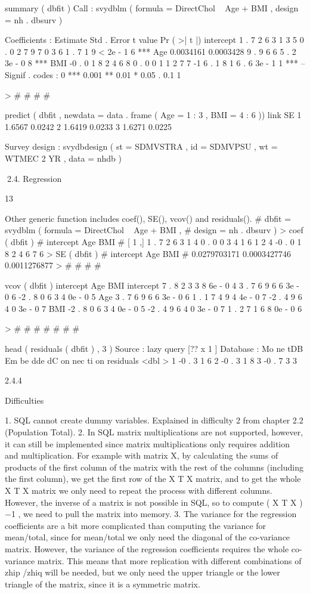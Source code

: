 summary ( dbfit )
Call :
svydblm ( formula = DirectChol ~ Age + BMI ,
design = nh . dbsurv )

Coefficients :
Estimate Std . Error t value Pr ( >| t |)
intercept 1 . 7 2 6 3 1 3 5 0 . 0 2 7 9 7 0 3 6 1 . 7 1 9 < 2e - 1 6 ***
Age
0.0034161 0.0003428
9 . 9 6 6 5 . 2 3e - 0 8 ***
BMI
-0 . 0 1 8 2 4 6 8 0 . 0 0 1 1 2 7 7 -1 6 . 1 8 1 6 . 6 3e - 1 1 ***
--Signif . codes : 0
***
0.001
**
0.01
*
0.05
.
0.1
1

>
#
#
#
#

predict ( dbfit , newdata = data . frame ( Age = 1 : 3 , BMI = 4 : 6 ))
link
SE
1 1.6567 0.0242
2 1.6419 0.0233
3 1.6271 0.0225

Survey design :
svydbdesign ( st = SDMVSTRA , id = SDMVPSU , wt = WTMEC 2 YR ,
data = nhdb )

2.4. Regression

13

Other generic function includes coef(), SE(), vcov() and residuals().
# dbfit = svydblm ( formula = DirectChol ~ Age + BMI ,
#
design = nh . dbsurv )
> coef ( dbfit )
#
intercept
Age
BMI
# [ 1 ,] 1 . 7 2 6 3 1 4 0 . 0 0 3 4 1 6 1 2 4 -0 . 0 1 8 2 4 6 7 6
> SE ( dbfit )
#
intercept
Age
BMI
# 0.0279703171 0.0003427746 0.0011276877
>
#
#
#
#

vcov ( dbfit )
intercept
Age
BMI
intercept 7 . 8 2 3 3 8 6e - 0 4 3 . 7 6 9 6 6 3e - 0 6 -2 . 8 0 6 3 4 0e - 0 5
Age
3 . 7 6 9 6 6 3e - 0 6 1 . 1 7 4 9 4 4e - 0 7 -2 . 4 9 6 4 0 3e - 0 7
BMI
-2 . 8 0 6 3 4 0e - 0 5 -2 . 4 9 6 4 0 3e - 0 7 1 . 2 7 1 6 8 0e - 0 6

>
#
#
#
#
#
#
#

head ( residuals ( dbfit ) , 3 )
Source :
lazy query [?? x 1 ]
Database : Mo ne tDB Em be dde dC on nec ti on
residuals
<dbl >
1
-0 . 3 1 6
2
-0 . 3 1 8
3
-0 . 7 3 3

2.4.4

Difficulties

1. SQL cannot create dummy variables. Explained in difficulty 2 from chapter 2.2
(Population Total).
2. In SQL matrix multiplications are not supported, however, it can still be implemented since matrix multiplications only requires addition and multiplication.
For example with matrix X, by calculating the sums of products of the first column of the matrix with the rest of the columns (including the first column), we
get the first row of the X T X matrix, and to get the whole X T X matrix we only
need to repeat the process with different columns. However, the inverse of
a matrix is not possible in SQL, so to compute ( X T X )−1 , we need to pull the
matrix into memory.
3. The variance for the regression coefficients are a bit more complicated than
computing the variance for mean/total, since for mean/total we only need the
diagonal of the co-variance matrix. However, the variance of the regression coefficients requires the whole co-variance matrix. This means that more replication with different combinations of zhip /zhiq will be needed, but we only need
the upper triangle or the lower triangle of the matrix, since it is a symmetric
matrix.

